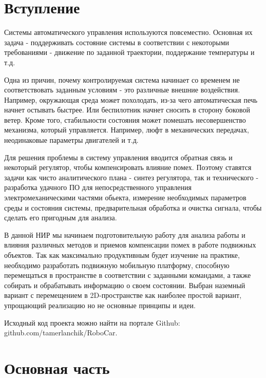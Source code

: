 \documentclass[14pt,a4paper,russian]{scrartcl}
\begin{document}
\renewcommand{\onlyinsubfile}[1]{}
\renewcommand{\notinsubfile}[1]{#1}

% 

\tableofcontents
\newpage

\section*{Вступление}
Системы автоматического управления используются повсеместно. Основная 
их задача - поддерживать состояние системы в соответствии 
с некоторыми требованиями - движение по заданной траектории, поддержание температуры и т.д.

Одна из причин, почему контролируемая система начинает со временем
не соответствовать заданным условиям - это различные внешние воздействия. Например,
окружающая среда может похолодать, из-за чего автоматическая печь начнет остывать
быстрее. Или беспилотник начнет сносить в сторону боковой ветер. Кроме того, 
стабильности состояния может помешать несовершенство механизма, который управляется.
Например, люфт в механических передачах, неодинаковые параметры двигателей и т.д.

Для решения проблемы в систему управления вводится обратная связь и некоторый 
регулятор, чтобы компенсировать влияние помех. Поэтому ставятся задачи как чисто 
аналитического плана - синтез регулятора, так и технического - разработка
удачного ПО для непосредственного управления электромеханическими частями обьекта,
измерение необходимых параметров среды и состояния системы, предварительная обработка
и очистка сигнала, чтобы сделать его пригодным для анализа.

В данной НИР мы начинаем подготовительную работу для анализа работы и влияния
различных методов и приемов компенсации помех в работе подвижных объектов. 
Так как максимально продуктивным будет изучение на практике, необходимо разработать
подвижную мобильную платформу, способную перемещаться в пространстве в соответствии
с заданными командами, а также собирать и обрабатывать информацию о своем состоянии.
Выбран наземный вариант с перемещением в 2D-пространстве как наиболее простой вариант,
упрощающий реализацию но не основные принципы и идеи.

Исходный код проекта можно найти на портале Github: github.com/tamerlanchik/RoboCar.

\newpage

\section*{Основная часть}
\end{document}
